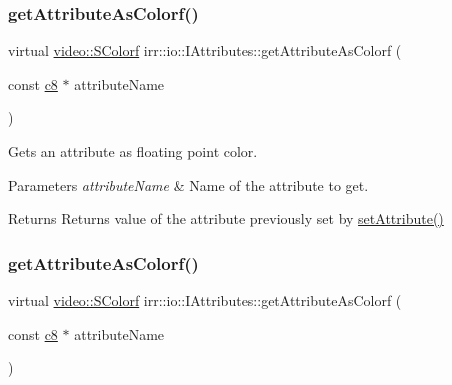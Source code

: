 \subsubsection{\texorpdfstring{get\+Attribute\+As\+Colorf()}{getAttributeAsColorf()}\hspace{0.1cm}{\footnotesize\ttfamily [1/4]}}
{\footnotesize\ttfamily virtual \hyperlink{classirr_1_1video_1_1SColorf}{video\+::\+S\+Colorf} irr\+::io\+::\+I\+Attributes\+::get\+Attribute\+As\+Colorf (\begin{DoxyParamCaption}\item[{const \hyperlink{namespaceirr_a9395eaea339bcb546b319e9c96bf7410}{c8} $\ast$}]{attribute\+Name }\end{DoxyParamCaption})\hspace{0.3cm}{\ttfamily [pure virtual]}}



Gets an attribute as floating point color. 


\begin{DoxyParams}{Parameters}
{\em attribute\+Name} & Name of the attribute to get. \\
\hline
\end{DoxyParams}
\begin{DoxyReturn}{Returns}
Returns value of the attribute previously set by \hyperlink{classirr_1_1io_1_1IAttributes_a03fa31acb481ae23678676cc183f09a6}{set\+Attribute()} 
\end{DoxyReturn}
\mbox{\label{classirr_1_1io_1_1IAttributes_ac072aeae816dd06e196eafb910511d2b}} 
\subsubsection{\texorpdfstring{get\+Attribute\+As\+Colorf()}{getAttributeAsColorf()}\hspace{0.1cm}{\footnotesize\ttfamily [2/4]}}
{\footnotesize\ttfamily virtual \hyperlink{classirr_1_1video_1_1SColorf}{video\+::\+S\+Colorf} irr\+::io\+::\+I\+Attributes\+::get\+Attribute\+As\+Colorf (\begin{DoxyParamCaption}\item[{const \hyperlink{namespaceirr_a9395eaea339bcb546b319e9c96bf7410}{c8} $\ast$}]{attribute\+Name }\end{DoxyParamCaption})\hspace{0.3cm}{\ttfamily [pure virtual]}}



